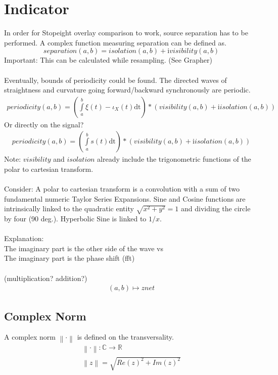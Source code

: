 \documentclass{report}
\newcommand\norm[1]{\left\lVert#1\right\rVert}
\begin{document}
\section{Indicator}
In order for Stopeight overlay comparison to work, source separation has to be performed. A complex function measuring separation can be defined as.
\begin{equation}
separation(a,b) = isolation(a,b) + \mathrm{i} visibility(a,b)
\end{equation}
Important: This can be calculated while resampling. (See Grapher)\\\\
Eventually, bounds of periodicity could be found. The directed waves of straightness and curvature going forward/backward synchronously are periodic.
\begin{align}
periodicity(a,b) =  (\int \limits _{a}^{b} \xi(t)-\iota_{X}(t) \mathrm{dt}) *(visibility(a,b) +\mathrm{i} isolation(a,b))
\end{align}
Or directly on the signal?
\begin{align}
periodicity(a,b) =  (\int \limits _{a}^{b} s(t) \mathrm{dt}) *(visibility(a,b) +\mathrm{i} isolation(a,b))
\end{align}
Note: $visibility$ and $isolation$ already include the trigonometric functions of the polar to cartesian transform.\\\\
Consider: A polar to cartesian transform is a convolution with a sum of two fundamental numeric Taylor Series Expansions. Sine and Cosine functions are intrinsically linked to the quadratic entity $\sqrt{x^2 + y^2} =1$ and dividing the circle by four (90 deg.). Hyperbolic Sine is linked to $1/x$.\\\\
Explanation:\\
The imaginary part is the other side of the wave vs\\
The imaginary part is the phase shift (fft)\\\\
(multiplication? addition?)
\begin{align}
(a,b) \mapsto znet
\end{align}

\subsection*{Complex Norm}
A complex norm $\norm{\cdot}$ is defined on the transversality.
\begin{align}
\norm{\cdot} : \mathbb{C} \rightarrow \mathbb{R}\\
\norm{z} = \sqrt{Re(z)^2+Im(z)^2}
\end{align}
\end{document}
